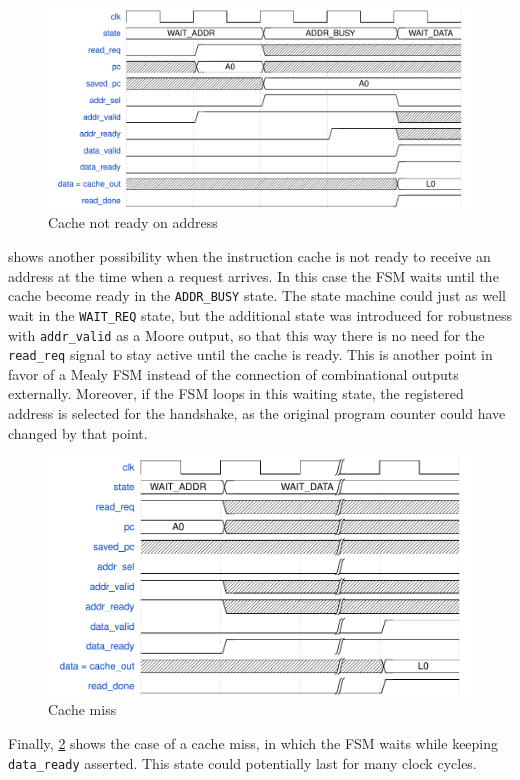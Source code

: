 \begin{figure}[hbt]
  \centering
  \includegraphics[width=\textwidth]{img/cache02.pdf}
  \caption{Cache not ready on address}
  \label{fig:cache02}
\end{figure}
 shows another possibility when the instruction cache is not ready to receive an address at the time when a request arrives. In this case the \acs{FSM} waits until the cache become ready in the \texttt{ADDR\_BUSY} state. The state machine could just as well wait in the \texttt{WAIT\_REQ} state, but the additional state was introduced for robustness with \texttt{addr\_valid} as a Moore output, so that this way there is no need for the \texttt{read\_req} signal to stay active until the cache is ready. This is another point in favor of a Mealy \acs{FSM} instead of the connection of combinational outputs externally. Moreover, if the \acs{FSM} loops in this waiting state, the registered address is selected for the handshake, as the original program counter could have changed by that point. 

\begin{figure}[hbt]
  \centering
  \includegraphics[width=\textwidth]{img/cache03.pdf}
  \caption{Cache miss}
  \label{fig:cache03}
\end{figure}
Finally, \cref{fig:cache03} shows the case of a cache miss, in which the \acs{FSM} waits while keeping \texttt{data\_ready} asserted. This state could potentially last for many clock cycles.

